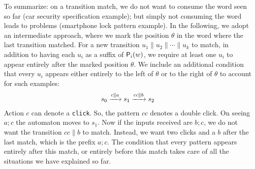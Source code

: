  To summarize: on a transition match, we do not want to consume the word seen so far (car security specification example); but simply not consuming the word leads to problems (smartphone lock pattern example). In the following, we adopt an intermediate approach, where we mark the position $\theta$ in the word where the last transition matched. For a new transition $u_1 \parallel u_2 \parallel \cdots \parallel u_k$ to match, in addition to having each $u_i$ as a suffix of $\mathsf{P}_{i}(w)$, we require at least one $u_i$ to appear entirely after the marked position $\theta$. We include an additional condition that every $u_i$ appears either entirely to the left of $\theta$ or to the right of $\theta$ to account for such examples: 
 \begin{align*}
  s_0 \xrightarrow{c \parallel a} s_1 \xrightarrow{cc \parallel b}s_2
 \end{align*}
 Action $c$ can denote a \texttt{click}. So, the pattern $cc$ denotes a double click. On seeing $a; c$ the automaton moves to $s_1$. Now if the inputs received are $b; c$, we do not want the transition $cc \parallel b$ to match. Instead, we want two clicks and a $b$ after the last match, which is the prefix $a; c$. The condition that every pattern appears entirely after this match, or entirely before this match takes care of all the situations we have explained so far.
 




